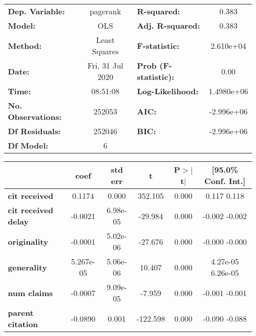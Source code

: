 \begin{center}
\begin{tabular}{lclc}
\toprule
\textbf{Dep. Variable:}     &     pagerank     & \textbf{  R-squared:         } &       0.383    \\
\textbf{Model:}             &       OLS        & \textbf{  Adj. R-squared:    } &       0.383    \\
\textbf{Method:}            &  Least Squares   & \textbf{  F-statistic:       } &   2.610e+04    \\
\textbf{Date:}              & Fri, 31 Jul 2020 & \textbf{  Prob (F-statistic):} &       0.00     \\
\textbf{Time:}              &     08:51:08     & \textbf{  Log-Likelihood:    } &   1.4980e+06   \\
\textbf{No. Observations:}  &      252053      & \textbf{  AIC:               } &   -2.996e+06   \\
\textbf{Df Residuals:}      &      252046      & \textbf{  BIC:               } &   -2.996e+06   \\
\textbf{Df Model:}          &           6      & \textbf{                     } &                \\
\bottomrule
\end{tabular}
\begin{tabular}{lccccc}
                            & \textbf{coef} & \textbf{std err} & \textbf{t} & \textbf{P$>$$|$t$|$} & \textbf{[95.0\% Conf. Int.]}  \\
\midrule
\textbf{cit received}       &       0.1174  &        0.000     &   352.105  &         0.000        &         0.117     0.118       \\
\textbf{cit received delay} &      -0.0021  &     6.98e-05     &   -29.984  &         0.000        &        -0.002    -0.002       \\
\textbf{originality}        &      -0.0001  &     5.02e-06     &   -27.676  &         0.000        &        -0.000    -0.000       \\
\textbf{generality}         &    5.267e-05  &     5.06e-06     &    10.407  &         0.000        &      4.27e-05  6.26e-05       \\
\textbf{num claims}         &      -0.0007  &     9.09e-05     &    -7.959  &         0.000        &        -0.001    -0.001       \\
\textbf{parent citation}    &      -0.0890  &        0.001     &  -122.598  &         0.000        &        -0.090    -0.088       \\

\end{tabular}
\end{center}
